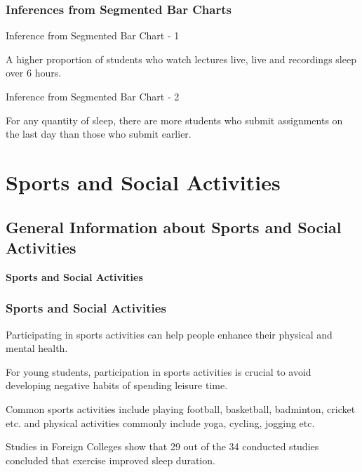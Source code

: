 \documentclass[11pt,]{beamer}
\begin{document}
\begin{frame}
    
    \frametitle{Inferences from Segmented Bar Charts}
    
    \begin{block}{Inference from Segmented Bar Chart - 1}
        
        A higher proportion of students who watch lectures live, live and recordings sleep over 6 hours. 
        
    \end{block}
    
    \bigskip
    
    \begin{block}{Inference from Segmented Bar Chart - 2}
        
        For any quantity of sleep, there are more students who submit assignments on the last day than those who submit earlier.
        
    \end{block}
    
\end{frame}

\section{Sports and Social Activities}

\subsection{General Information about Sports and Social Activities}

\begin{frame}

    \begin{block}{\textbf{Sports and Social Activities}}
    
    \end{block}
    
\end{frame}

\begin{frame}

	\frametitle{Sports and Social Activities}
	
	Participating in sports activities can help people enhance their physical and mental health. 
	
	\bigskip
	
	For young students, participation in sports activities is crucial to avoid developing negative habits of spending leisure time. 
	
	\bigskip
	
	Common sports activities include playing football, basketball, badminton, cricket etc. and physical activities commonly include yoga, cycling, jogging etc. 
	
	\bigskip
    
	Studies in Foreign Colleges show that 29 out of the 34 conducted studies concluded that exercise improved sleep duration. 
	
\end{frame}
\end{document}
